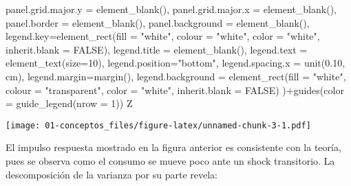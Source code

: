 \documentclass[
]{book}
\newenvironment{Shaded}{\begin{snugshade}}{\end{snugshade}}
\newcommand{\AttributeTok}[1]{\textcolor[rgb]{0.77,0.63,0.00}{#1}}
\newcommand{\ConstantTok}[1]{\textcolor[rgb]{0.00,0.00,0.00}{#1}}
\newcommand{\DecValTok}[1]{\textcolor[rgb]{0.00,0.00,0.81}{#1}}
\newcommand{\FloatTok}[1]{\textcolor[rgb]{0.00,0.00,0.81}{#1}}
\newcommand{\FunctionTok}[1]{\textcolor[rgb]{0.00,0.00,0.00}{#1}}
\newcommand{\NormalTok}[1]{#1}
\newcommand{\SpecialCharTok}[1]{\textcolor[rgb]{0.00,0.00,0.00}{#1}}
\newcommand{\StringTok}[1]{\textcolor[rgb]{0.31,0.60,0.02}{#1}}
\begin{document}
\begin{Shaded}
\begin{Highlighting}[]
           \AttributeTok{panel.grid.major.y =} \FunctionTok{element\_blank}\NormalTok{(),}
           \AttributeTok{panel.grid.major.x =} \FunctionTok{element\_blank}\NormalTok{(),}
           \AttributeTok{panel.border =} \FunctionTok{element\_blank}\NormalTok{(),}
           \AttributeTok{panel.background =} \FunctionTok{element\_blank}\NormalTok{(),}
           \AttributeTok{legend.key=}\FunctionTok{element\_rect}\NormalTok{(}\AttributeTok{fill =} \StringTok{"white"}\NormalTok{, }\AttributeTok{colour =} \StringTok{"white"}\NormalTok{,}
                                   \AttributeTok{color =} \StringTok{"white"}\NormalTok{, }\AttributeTok{inherit.blank =} \ConstantTok{FALSE}\NormalTok{),}
           \AttributeTok{legend.title =} \FunctionTok{element\_blank}\NormalTok{(),}
           \AttributeTok{legend.text  =} \FunctionTok{element\_text}\NormalTok{(}\AttributeTok{size=}\DecValTok{10}\NormalTok{),}
           \AttributeTok{legend.position=}\StringTok{"bottom"}\NormalTok{,}
           \AttributeTok{legend.spacing.x =} \FunctionTok{unit}\NormalTok{(}\FloatTok{0.10}\NormalTok{, }\StringTok{\textquotesingle{}cm\textquotesingle{}}\NormalTok{),}
           \AttributeTok{legend.margin=}\FunctionTok{margin}\NormalTok{(),}
           \AttributeTok{legend.background =} \FunctionTok{element\_rect}\NormalTok{(}\AttributeTok{fill =} \StringTok{"white"}\NormalTok{, }\AttributeTok{colour =} \StringTok{"transparent"}\NormalTok{,}
                                            \AttributeTok{color =} \StringTok{"white"}\NormalTok{, }\AttributeTok{inherit.blank =} \ConstantTok{FALSE}\NormalTok{)}
\NormalTok{)}\SpecialCharTok{+}\FunctionTok{guides}\NormalTok{(}\AttributeTok{color =} \FunctionTok{guide\_legend}\NormalTok{(}\AttributeTok{nrow =} \DecValTok{1}\NormalTok{))}
\NormalTok{Z}
\end{Highlighting}
\end{Shaded}

\texttt{[image: 01-conceptos\_files/figure-latex/unnamed-chunk-3-1.pdf]}

El impulso respuesta mostrado en la figura anterior es consistente con la teoría, pues se observa como el consumo se mueve poco ante un shock transitorio. La descomposición de la varianza por su parte revela:
\end{document}
